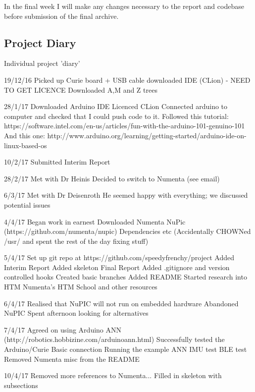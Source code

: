 \documentclass[a4paper]{article}
\begin{document}
In the final week I will make any changes necessary to the report and codebase before submission of the final archive. 

\subsection{Project Diary}%
\label{subsec:a3_pd}

Individual project 'diary'

19/12/16
    Picked up Curie board + USB cable
    downloaded IDE (CLion) - NEED TO GET LICENCE
    Downloaded A,M and Z trees

28/1/17
    Downloaded Arduino IDE
    Licenced CLion
    Connected arduino to computer and checked that I could push code to it.
        Followed this tutorial: https://software.intel.com/en-us/articles/fun-with-the-arduino-101-genuino-101
        And this one: http://www.arduino.org/learning/getting-started/arduino-ide-on-linux-based-os

10/2/17
    Submitted Interim Report

28/2/17
    Met with Dr Heinis
    Decided to switch to Numenta (see email)

6/3/17
    Met with Dr Deisenroth
    He seemed happy with everything; we discussed potential issues

4/4/17
    Began work in earnest
    Downloaded Numenta NuPic (https://github.com/numenta/nupic)
        Dependencies etc
    (Accidentally CHOWNed /usr/ and spent the rest of the day fixing stuff)

5/4/17
    Set up git repo at https://github.com/speedyfrenchy/project
        Added Interim Report
        Added skeleton Final Report
        Added .gitignore and version controlled hooks
        Created basic branches
        Added README        
    Started research into HTM
        Numenta's HTM School and other resources

6/4/17
    Realised that NuPIC will not run on embedded hardware
    Abandoned NuPIC
    Spent afternoon looking for alternatives

7/4/17
    Agreed on using Arduino ANN (http://robotics.hobbizine.com/arduinoann.html)
    Successfully tested the Arduino/Curie
        Basic connection
        Running the example ANN
        IMU test
        BLE test
    Removed Numenta misc from the README

10/4/17
    Removed more references to Numenta...
    Filled in skeleton with subsections
\end{document}
